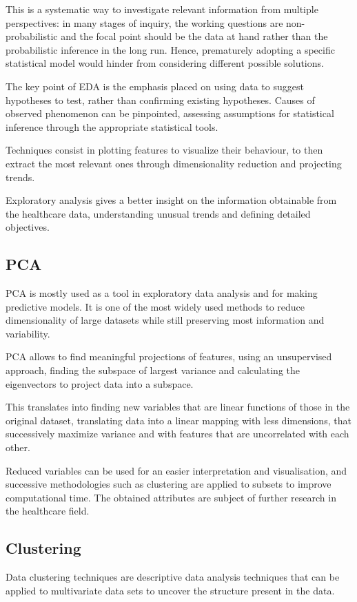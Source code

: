 This is a systematic way to investigate relevant information from multiple perspectives: in many stages of inquiry, the working questions are non­-probabilistic and the focal point should be the data at hand rather than the probabilistic inference in the long run. Hence, prematurely adopting a specific statistical model would hinder from considering different possible solutions.

The key point of EDA is the emphasis placed on using data to suggest hypotheses to test, rather than confirming existing hypotheses. Causes of observed phenomenon can be pinpointed, assessing assumptions for statistical inference through the appropriate statistical tools.

Techniques consist in plotting features to visualize their behaviour, to then extract the most relevant ones through dimensionality reduction and projecting trends.

Exploratory analysis gives a better insight on the information obtainable from the healthcare data, understanding unusual trends and defining detailed objectives.

\subsection{PCA}
PCA is mostly used as a tool in exploratory data analysis and for making predictive models. It is one of the most widely used methods to reduce dimensionality of large datasets while still preserving most information and variability.

PCA allows to find meaningful projections of features, using an unsupervised approach, finding the subspace of largest variance and calculating the eigenvectors to project data into a subspace.

This translates into finding new variables that are linear functions of those in the original dataset, translating data into a linear mapping with less dimensions, that successively maximize variance and with features that are uncorrelated with each other\cite{pca}. 

Reduced variables can be used for an easier interpretation and visualisation, and successive methodologies such as clustering are applied to subsets to improve computational time. The obtained attributes are subject of further research in the healthcare field.

\subsection{Clustering}
Data clustering techniques are descriptive data analysis techniques that can be applied to multivariate data sets to uncover the structure present in the data. 

